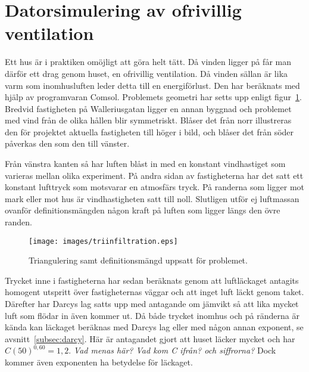 \section{Datorsimulering av ofrivillig ventilation}

Ett hus är i praktiken omöjligt att göra helt tätt. Då vinden ligger på
får man därför ett drag genom huset, en ofrivillig ventilation. Då vinden
sällan är lika varm som inomhusluften leder detta till en energiförlust.
Den har beräknats med hjälp av programvaran Comsol. Problemets geometri har
setts upp enligt figur~\ref{fig:windmethod:tri}. Bredvid fastigheten på Walleriusgatan ligger en annan byggnad och problemet med vind från de olika hållen blir symmetriskt. Blåser det från norr illustreras den för projektet aktuella fastigheten till höger i bild, och blåser det från söder påverkas den som den till vänster.

Från vänstra kanten så har luften blåst in med en konstant vindhastiget som varieras mellan olika
experiment. På andra sidan av fastigheterna har det satt ett konstant lufttryck som motsvarar en
atmosfärs tryck. På randerna som ligger mot mark eller mot hus är vindhastigheten satt till noll.
Slutligen utför ej luftmassan ovanför definitionsmängden någon kraft på luften som ligger längs den
övre randen.

\begin{figure}
\centering
\texttt{[image: images/triinfiltration.eps]}
\caption{Triangulering samt definitionsmängd uppsatt för problemet.}\label{fig:windmethod:tri}
\end{figure}

Trycket inne i fastigheterna har sedan beräknats genom att luftläckaget antagits homogent utspritt över fastigheternas
väggar och att inget luft läckt genom taket. Därefter har Darcys lag satts upp med antagande om jämvikt så att lika mycket
luft som flödar in även kommer ut. Då både trycket inomhus och på ränderna är kända kan läckaget beräknas med Darcys lag
eller med någon annan exponent, se avsnitt~\ref{subsec:darcy}. Här är antagandet gjort att huset läcker mycket och har $C(50)^{0,60} = 1,2$. \emph{\color{red} Vad menas här? Vad kom C ifrån? och siffrorna?} Dock kommer även exponenten ha betydelse för läckaget.\cite{sasic}
